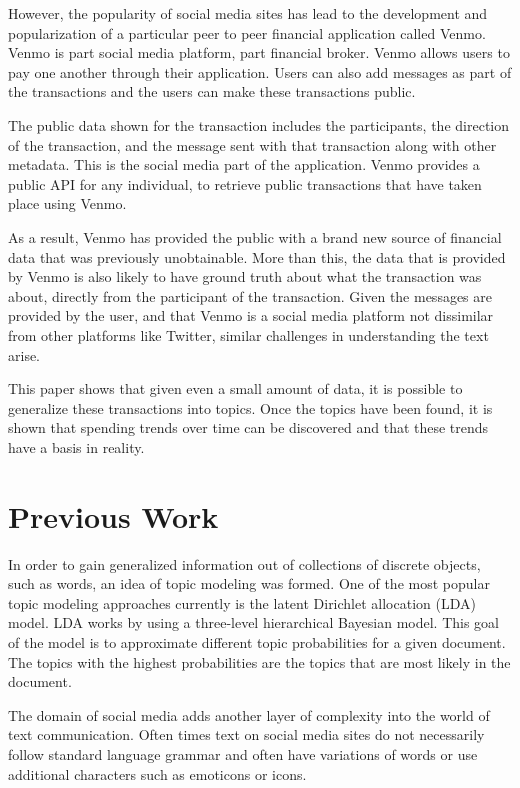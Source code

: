 \documentclass[conference]{IEEEtran}
\begin{document}
However, the popularity of social media sites has lead to the development and popularization of a particular peer to peer financial application called Venmo. Venmo is part social media platform, part financial broker. Venmo allows users to pay one another through their application. Users can also add messages as part of the transactions and the users can make these transactions public. 

The public data shown for the transaction includes the participants, the direction of the transaction, and the message sent with that transaction along with other metadata. This is the social media part of the application. Venmo provides a public API for any individual, to retrieve public transactions that have taken place using Venmo. 

As a result, Venmo has provided the public with a brand new source of financial data that was previously unobtainable. More than this, the data that is provided by Venmo is also likely to have ground truth about what the transaction was about, directly from the participant of the transaction. Given the messages are provided by the user, and that Venmo is a social media platform not dissimilar from other platforms like Twitter, similar challenges in understanding the text arise. 

This paper shows that given even a small amount of data, it is possible to generalize these transactions into topics. Once the topics have been found, it is shown that spending trends over time can be discovered and that these trends have a basis in reality. 

\section{Previous Work}
In order to gain generalized information out of collections of discrete objects, such as words, an idea of topic modeling was formed. One of the most popular topic modeling approaches currently is the latent Dirichlet allocation (LDA) \cite{LDA} model. LDA works by using a three-level hierarchical Bayesian model. This goal of the model is to approximate different topic probabilities for a given document. The topics with the highest probabilities are the topics that are most likely in the document. 

The domain of social media adds another layer of complexity into the world of text communication. Often times text on social media sites do not necessarily follow standard language grammar and often have variations of words or use additional characters such as emoticons or icons. 
\end{document}
